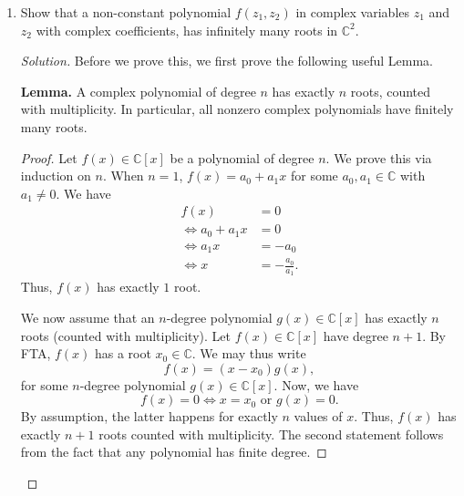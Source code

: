 \documentclass[11pt]{article}
\theoremstyle{definition}
\newenvironment{blockquote}
{\begin{mdframed}[skipabove=0pt, skipbelow=0pt, innertopmargin=4pt, innerbottommargin=4pt, bottomline=false,topline=false,rightline=false, linewidth=2pt]}
{\end{mdframed}}
\newenvironment{soln}{\begin{proof}[Solution]}{\end{proof}}
\begin{document}
\begin{enumerate}[leftmargin=*]
\begin{soln}
		Thus, $x_0$ and $\overline{x}_0$ are two distinct roots of $f(x)$. Define $g(x) \vcentcolon= (x-x_0)(x-\overline{x}_0)$. A priori, we have $g(x) \in \mathbb{C}[x]$. However, note that
		\[
		    (x-x_0)(x-\overline{x}_0) = x^2 - (2\mathfrak{R}x_0)x + \abs{x_0}^2 \in \mathbb{R}[x].
		\]
		Thus, $g(x)$ is in fact a real polynomial. Since $x_0$ and $\overline{x}_0$ are distinct, we see that $g(x)$ divides $f(x)$ in $\mathbb{C}[x]$. (Why?) Thus,
		\[
		    f(x) = g(x) h(x)
		\]
		for some $h(x) \in \mathbb{C}[x]$. Again, since $f(x)$ and $g(x)$ are both real polynomials, so is $f=h(x)$. Moreover, since $\deg f(x) \geq 3$ and $\deg g(x) = 2$, we have $\deg h(x) \geq 1$, and we are done. \qedhere

    \end{soln}
    
    \item Show that a non-constant polynomial $f(z_1, z_2)$ in complex variables $z_1$ and $z_2$ with complex coefficients, has infinitely many roots in $\mathbb{C}^2$.
    
    \begin{soln}
        Before we prove this, we first prove the following useful Lemma.
        
        \medskip
        
        \begin{blockquote}
			\textbf{Lemma.} A complex polynomial of degree $n$ has exactly $n$ roots, counted with multiplicity. In particular, all nonzero complex polynomials have finitely many roots. 
			\begin{proof} 
				Let $f(x) \in \mathbb{C}[x]$ be a polynomial of degree $n$. We prove this via induction on $n$. When $n = 1$, $f(x) = a_0 + a_1x$ for some $a_0,a_1 \in \mathbb{C}$ with $a_1 \neq 0$. We have
				\begin{align*}
				    f(x) &= 0 \\
				    \iff a_0 + a_1 x &= 0 \\
				    \iff a_1x &= -a_0 \\
				    \iff x &= -\frac{a_0}{a_1}.
				\end{align*}
				Thus, $f(x)$ has exactly $1$ root. 
				
				We now assume that an $n$-degree polynomial $g(x) \in \mathbb{C}[x]$ has exactly $n$ roots (counted with multiplicity). Let $f(x) \in \mathbb{C}[x]$ have degree $n+1$. By FTA, $f(x)$ has a root $x_0 \in \mathbb{C}$. We may thus write
				\[
				    f(x) = (x-x_0)g(x),
				\]
				for some $n$-degree polynomial $g(x) \in \mathbb{C}[x]$. Now, we have
				\[
				    f(x) = 0 \iff x = x_0 \text{ or } g(x) = 0.
				\]
				By assumption, the latter happens for exactly $n$ values of $x$. Thus, $f(x)$ has exactly $n+1$ roots counted with multiplicity. The second statement follows from the fact that any polynomial has finite degree.
			\end{proof}
		\end{blockquote}
        

\end{soln}
\end{enumerate}
\end{document}
